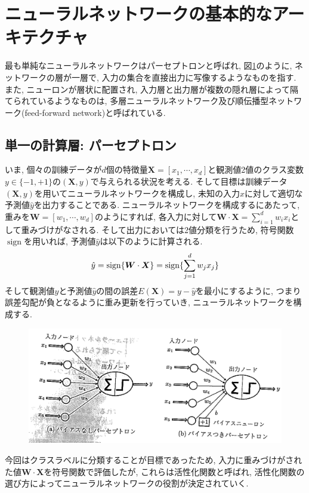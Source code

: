 \documentclass[dvipdfmx,report,11pt]{jsbook}
\begin{document}
\section{ニューラルネットワークの基本的なアーキテクチャ}
最も単純なニューラルネットワークはパーセプトロンと呼ばれ, 図\ref{fig3}のように, ネットワークの層が一層で, 入力の集合を直接出力に写像するようなものを指す. また, ニューロンが層状に配置され, 入力層と出力層が複数の隠れ層によって隔てられているようなものは, 多層ニューラルネットワーク及び順伝播型ネットワーク(feed-forward network)と呼ばれている.


\subsection{単一の計算層: パーセプトロン}
いま, 個々の訓練データが$d$個の特徴量$\bm{X}=[x_1, \cdots, x_d]$と観測値2値のクラス変数$y\in\{-1,+1\}$の$(\bm{X},y)$で与えられる状況を考える. そして目標は訓練データ$(\bm{X},y)$を用いてニューラルネットワークを構成し, 未知の入力$x$に対して適切な予測値$\hat{y}$を出力することである. ニューラルネットワークを構成するにあたって, 重みを$\bm{W}=[w_1, \cdots, w_d]$のようにすれば, 各入力に対して$\bm{W}\cdot \bm{X}=\sum_{i=1}^d w_i x_i$として重みづけがなされる. そして出力においては2値分類を行うため, 符号関数$\operatorname{sign}$を用いれば, 予測値$\hat{y}$は以下のように計算される.
\begin{align}
  \hat{y}=\operatorname{sign}\{\bm{W}\cdot\bm{X}\}=\operatorname{sign}\{\sum_{j=1}^{d}w_jx_j\}
\end{align}
そして観測値$y$と予測値$\hat{y}$の間の誤差$E(\bm{X})=y-\hat{y}$を最小にするように, つまり誤差勾配が負となるように重み更新を行っていき, ニューラルネットワークを構成する.

\begin{figure}[H]
  \centering
    \includegraphics[width=0.5\linewidth]{figure/fig3.png}
    \caption{}
    \label{fig3}
\end{figure}

今回はクラスラベルに分類することが目標であったため, 入力に重みづけがされた値$\bm{W}\cdot \bm{X}$を符号関数で評価したが, これらは活性化関数と呼ばれ, 活性化関数の選び方によってニューラルネットワークの役割が決定されていく.
\end{document}
